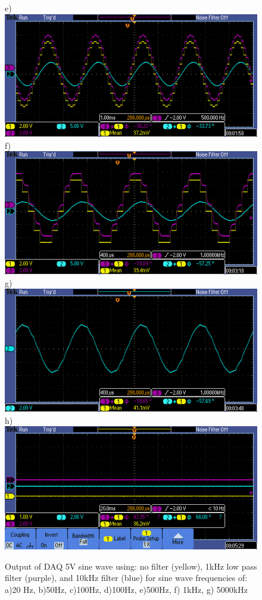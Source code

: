 \documentclass{article}
\begin{document}
\begin{figure}[H]
        e)\includegraphics[scale = 0.4]{7e.PNG}
        f)\includegraphics[scale = 0.4]{7f.PNG}
        g)\includegraphics[scale = 0.4]{7g.PNG}
        h)\includegraphics[scale = 0.4]{7h.PNG}
        \caption{Output of DAQ 5V sine wave using: no filter (yellow), 1kHz low pass filter (purple), and 10kHz filter (blue) for sine wave frequencies of: a)20 Hz, b)50Hz, c)100Hz, d)100Hz, e)500Hz, f) 1kHz, g) 5000kHz \cite{lab10}}
        \label{fig:my_label}
    \end{figure}
\end{document}
